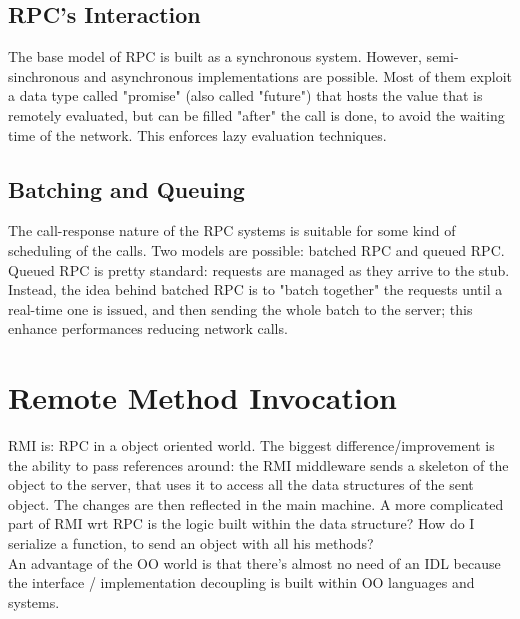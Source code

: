 \documentclass[10pt,a4paper]{article}
\begin{document}
			\subsection{RPC's Interaction}
				The base model of RPC is built as a synchronous system. However, semi-sinchronous and asynchronous implementations are possible. Most of them exploit a data type called "promise" (also called "future") that hosts the value that is remotely evaluated, but can be filled "after" the call is done, to avoid the waiting time of the network. This enforces lazy evaluation techniques. 
				
			\subsection{Batching and Queuing}
				The call-response nature of the RPC systems is suitable for some kind of scheduling of the calls. Two models are possible: batched RPC and queued RPC. Queued RPC is pretty standard: requests are managed as they arrive to the stub. Instead, the idea behind batched RPC is to "batch together" the requests until a real-time one is issued, and then sending the whole batch to the server; this enhance performances reducing network calls.

		\section{Remote Method Invocation}
			RMI is: RPC in a object oriented world. The biggest difference/improvement is the ability to pass references around: the RMI middleware sends a skeleton of the object to the server, that uses it to access all the data structures of the sent object. The changes are then reflected in the main machine. A more complicated part of RMI wrt RPC is the logic built within the data structure? How do I serialize a function, to send an object with all his methods?\\
			An advantage of the OO world is that there's almost no need of an IDL because the interface / implementation decoupling is built within OO languages and systems. 
			
\end{document}

